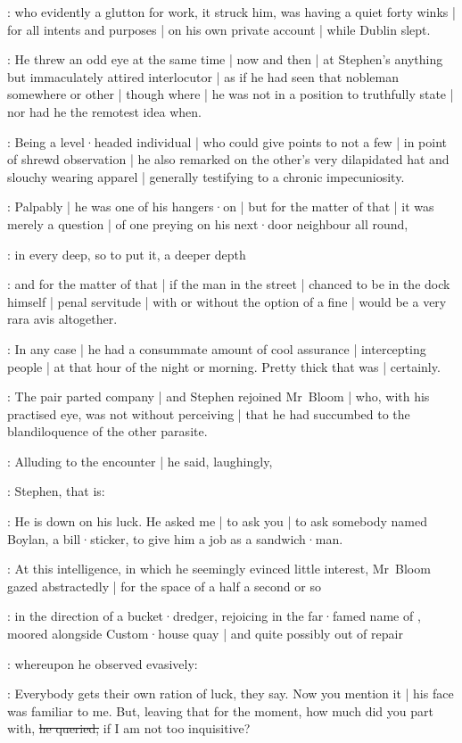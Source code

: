 :
who evidently a glutton for work,
it struck him,
was having a quiet forty winks |
for all intents and purposes |
on his own private account |
while Dublin slept.

:
He threw an odd eye at the same time |
now and then |
at Stephen's anything but immaculately attired interlocutor |
as if he had seen that nobleman somewhere or other |
though where |
he was not in a position to truthfully state |
nor had he the remotest idea when.

:
Being a level·headed individual |
who could give points to not a few |
in point of shrewd observation |
he also remarked
on the other's very dilapidated hat and slouchy wearing apparel |
generally testifying to a chronic impecuniosity.

:
Palpably |
he was one of his hangers·on |
but for the matter of that |
it was merely a question |
of one preying on his next·door neighbour all round,

:
in every deep,
so to put it,
a deeper depth

:
and for the matter of that |
if the man in the street |
chanced to be in the dock himself |
penal servitude |
with or without the option of a fine |
would be a very rara avis altogether.

:
In any case |
he had a consummate amount of cool assurance |
intercepting people |
at that hour of the night or morning.
Pretty thick that was |
certainly.

:
The pair parted company |
and Stephen rejoined Mr~Bloom |
who,
with his practised eye,
was not without perceiving |
that he had succumbed to the blandiloquence of the other parasite.

:
Alluding to the encounter |
he said,
laughingly,

:
Stephen,
that is:

\Stephen:
He is down on his luck.
He asked me |
to ask you |
to ask somebody named Boylan,
a bill·sticker,
to give him a job as a sandwich·man.

:
At this intelligence,
in which he seemingly evinced little interest,
Mr~Bloom gazed abstractedly |
for the space of a half a second or so

:
in the direction of a bucket·dredger,
rejoicing in the far·famed name of ,
moored alongside Custom·house quay |
and quite possibly out of repair

:
whereupon he observed evasively:

\Bloom:
Everybody gets their own ration of luck,
they say.
Now you mention it |
his face was familiar to me.
But,
leaving that for the moment,
how much did you part with,
\sout{he queried,}
if I am not too inquisitive?

